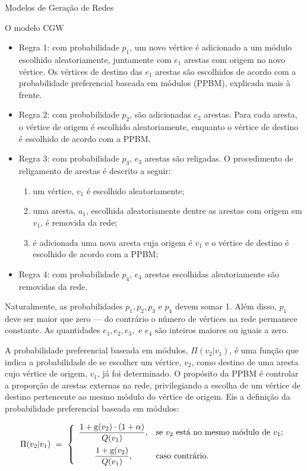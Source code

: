 \begin{section}{Modelos de Geração de Redes}
\begin{subsection}{O modelo CGW}
\begin{itemize}
	\item Regra 1: com probabilidade $p_1$, um novo vértice é adicionado a um módulo escolhido aleatoriamente, juntamente com $e_1$ arestas com origem no novo vértice. Os vértices de destino das $e_1$ arestas são escolhidos de acordo com a probabilidade preferencial baseada em módulos (PPBM), explicada mais à frente.
	
	\item Regra 2: com probabilidade $p_2$, são adicionadas $e_2$ arestas. Para cada aresta, o vértice de origem é escolhido aleatoriamente, enquanto o vértice de destino é escolhido de acordo com a PPBM.
	
	\item Regra 3: com probabilidade $p_3$, $e_3$ arestas são religadas. O procedimento de religamento de arestas é descrito a seguir:
	
	\begin{enumerate}
		\item um vértice, $v_1$ é escolhido aleatoriamente;
		\item uma aresta, $a_1$, escolhida aleatoriamente dentre as arestas com origem em $v_1$, é removida da rede;
		\item é adicionada uma nova aresta cuja origem é $v_1$ e o vértice de destino é escolhido de acordo com a PPBM;
	\end{enumerate}
	
	\item Regra 4: com probabilidade $p_4$, $e_4$ arestas escolhidas aleatoriamente são removidas da rede.
	
\end{itemize}

Naturalmente, as probabilidades $p_1, p_2, p_3$ e $p_4$ devem somar 1. Além disso, $p_1$ deve ser maior que zero --- do contrário o número de vértices na rede permanece constante. As quantidades $e_1, e_2, e_3, $ e $e_4$ são inteiros maiores ou iguais a zero.

A probabilidade preferencial baseada em módulos, $\Pi(v_2|v_1)$, é uma função que indica a probabilidade de se escolher um vértice, $v_2$, como destino de uma aresta cujo vértice de origem, $v_1$, já foi determinado. O propósito da PPBM é controlar a proporção de arestas externas na rede, privilegiando a escolha de um vértice de destino pertencente ao mesmo módulo do vértice de origem. Eis a definição da probabilidade preferencial baseada em módulos:

$$
\Pi (v_2|v_1) ~=~
\left\{
\begin{array}{cl}
\dfrac{1 + \mathrm{g}(v_2) \cdot (1 + \alpha)}{Q(v_1)}\mbox{,} 
  & \mbox{se $v_2$ está no mesmo módulo de $v_1$;} \vspace{0.5em} \\ 
\dfrac{1 + \mathrm{g}(v_2)}{Q(v_1)}\mbox{,}
  & \mbox{caso contrário.}
\end{array}
\right.
$$


\end{subsection}
\end{section}
